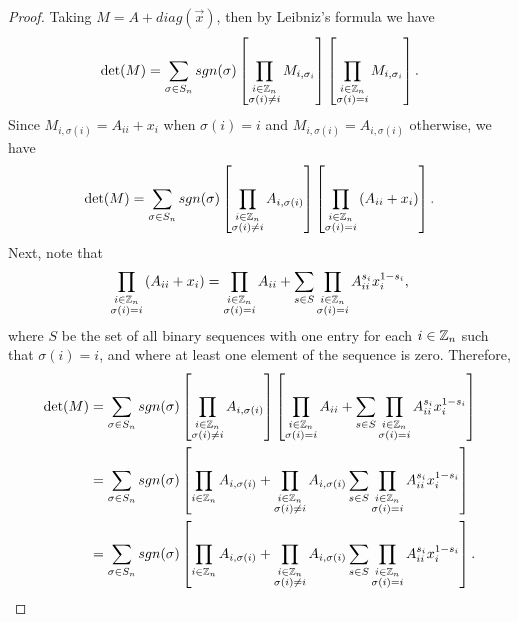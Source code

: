 \begin{proof}
    Taking $M = A + diag(\vec{x})$, then by Leibniz's formula we have
    \begin{align*}
        \det(M) = \sum_{\sigma\in S_n}sgn(\sigma)\left[\prod_{\substack{i \in \mathbb{Z}_n \\ \sigma(i) \neq i}}M_{i,\sigma_i}\right]\left[\prod_{\substack{i \in \mathbb{Z}_n \\ \sigma(i) = i}}M_{i,\sigma_i}\right].
    \end{align*}
    Since $M_{i,\sigma(i)} = A_{ii} + x_i$ when $\sigma(i) = i$ and $M_{i,\sigma(i)} = A_{i,\sigma(i)}$ otherwise, we have
    \begin{align*}
        \det(M) = \sum_{\sigma\in S_n}sgn(\sigma)\left[\prod_{\substack{i \in \mathbb{Z}_n \\ \sigma(i) \neq i}}A_{i,\sigma(i)}\right]\left[\prod_{\substack{i \in \mathbb{Z}_n \\ \sigma(i) = i}}\left(A_{ii}+x_i\right)\right].
    \end{align*}
    Next, note that
    \begin{align*}
        \prod_{\substack{i \in \mathbb{Z}_n \\ \sigma(i) = i}}\left(A_{ii}+x_i\right) = \prod_{\substack{i \in \mathbb{Z}_n \\ \sigma(i) = i}}A_{ii} + \sum_{s\in S}\prod_{\substack{i \in \mathbb{Z}_n \\ \sigma(i) = i}}A_{ii}^{s_i}x_i^{1-s_i},
    \end{align*}
    where $S$ be the set of all binary sequences with one entry for each $i \in \mathbb{Z}_n$ such that $\sigma(i) = i$, and where at least one element of the sequence is zero.
    Therefore,
    \begin{align*}
        \det(M) &= \sum_{\sigma\in S_n}sgn(\sigma)\left[\prod_{\substack{i \in \mathbb{Z}_n \\ \sigma(i) \neq i}}A_{i,\sigma(i)}\right]\left[\prod_{\substack{i \in \mathbb{Z}_n \\ \sigma(i) = i}}A_{ii} + \sum_{s\in S}\prod_{\substack{i \in \mathbb{Z}_n \\ \sigma(i) = i}}A_{ii}^{s_i}x_i^{1-s_i}\right] \\
        &= \sum_{\sigma\in S_n}sgn(\sigma)\left[\prod_{i \in \mathbb{Z}_n}A_{i,\sigma(i)} + \prod_{\substack{i \in \mathbb{Z}_n \\ \sigma(i) \neq i}}A_{i,\sigma(i)}\sum_{s\in S}\prod_{\substack{i \in \mathbb{Z}_n \\ \sigma(i) = i}}A_{ii}^{s_i}x_i^{1-s_i}\right] \\
        &= \sum_{\sigma\in S_n}sgn(\sigma)\left[\prod_{i \in \mathbb{Z}_n}A_{i,\sigma(i)} + \prod_{\substack{i \in \mathbb{Z}_n \\ \sigma(i) \neq i}}A_{i,\sigma(i)}\sum_{s\in S}\prod_{\substack{i \in \mathbb{Z}_n \\ \sigma(i) = i}}A_{ii}^{s_i}x_i^{1-s_i}\right].
    \end{align*}
\end{proof}

